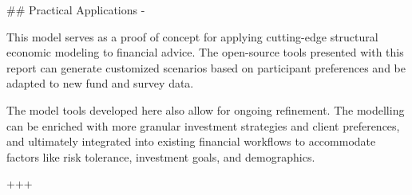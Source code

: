 ## Practical Applications {-}

This model serves as a proof of concept for applying cutting-edge structural economic modeling to financial advice. The open-source tools presented with this report can generate customized scenarios based on participant preferences and be adapted to new fund and survey data.

The model tools developed here also allow for ongoing refinement. The modelling can be enriched with more granular investment strategies and client preferences, and ultimately integrated into existing financial workflows to accommodate factors like risk tolerance, investment goals, and demographics.

+++
